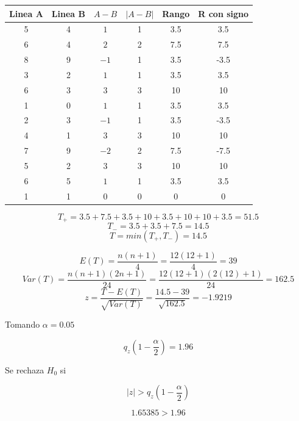 \documentclass{article}
\begin{document}
\begin{center}
    \begin{tabular}{c c c c c c}
        Linea A & Linea B & $ A - B $ & $| A - B |$ & Rango & R con signo \\
        \hline
        5       & 4       & $1$       & 1           & 3.5   & 3.5         \\
        6       & 4       & $2$       & 2           & 7.5   & 7.5         \\
        8       & 9       & $-1$      & 1           & 3.5   & -3.5        \\
        3       & 2       & $1$       & 1           & 3.5   & 3.5         \\
        6       & 3       & $3$       & 3           & 10    & 10          \\
        1       & 0       & $1$       & 1           & 3.5   & 3.5         \\
        2       & 3       & $-1$      & 1           & 3.5   & -3.5        \\
        4       & 1       & $3$       & 3           & 10    & 10          \\
        7       & 9       & $-2$      & 2           & 7.5   & -7.5        \\
        5       & 2       & $3$       & 3           & 10    & 10          \\
        6       & 5       & $1$       & 1           & 3.5   & 3.5         \\
        1       & 1       & $0$       & 0           & 0     & 0           \\
    \end{tabular}
\end{center}

\[T_{+} = 3.5 + 7.5 + 3.5 + 10 + 3.5 + 10 + 10 + 3.5 = 51.5\]
\[T_{-} = 3.5 + 3.5 + 7.5 = 14.5\]
\[T = min(T_{+}, T_{-}) = 14.5\]

\[
    E(T) = \frac{n(n + 1)}{4} = \frac{12(12 + 1)}{4} = 39
\]
\[
    Var(T) = \frac{n(n + 1)(2n + 1)}{24} = \frac{12(12 + 1)(2(12) + 1)}{24} = 162.5
\]
\[
    z = \frac{T - E(T)}{\sqrt{Var(T)}} = \frac{14.5 - 39}{\sqrt{162.5}} = -1.9219
\]

Tomando $\alpha = 0.05$

\[q_z(1 - \frac{\alpha}{2}) = 1.96\]

Se rechaza $H_0$ si

\[|z| > q_z(1-\frac{\alpha}{2})\]

\[1.65385 > 1.96\]
\end{document}
